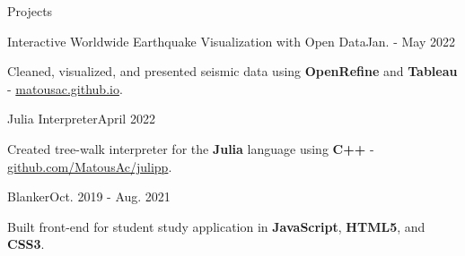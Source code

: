 \begin{rSection}{Projects}
	\begin{project}{Interactive Worldwide Earthquake Visualization with Open Data}{Jan. - May 2022}{}{}
		\item Cleaned, visualized, and presented seismic data using {\bf OpenRefine} and {\bf Tableau} - \href{https://matousac.github.io/}{matousac.github.io}.
	\end{project}
	\begin{project}{Julia Interpreter}{April 2022}{}{}
		\item Created tree-walk interpreter for the {\bf Julia} language using {\bf C++} - \href{https://github.com/MatousAc/julipp}{github.com/MatousAc/julipp}.
	\end{project}
	\begin{project}{Blanker}{Oct. 2019 - Aug. 2021}{}{}
		\item Built front-end for student study application in {\bf JavaScript}, {\bf HTML5}, and {\bf CSS3}.
	\end{project}
\end{rSection}